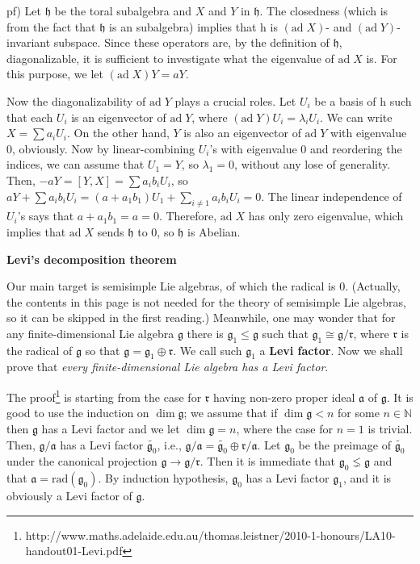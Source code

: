 \documentclass{article}
\newcommand{\NaN}{\mathbb{N}}
\newcommand{\lie}[1]{\mathfrak{#1}}
\newcommand{\ad}[1]{\mathrm{ad}\; #1}
\begin{document}
pf) Let $\lie{h}$ be the toral subalgebra and $X$ and $Y$ in $\lie{h}$.
The closedness (which is from the fact that $\lie{h}$ is an subalgebra) implies that h is $(\ad{X})$- and $(\ad{Y})$-invariant subspace.
Since these operators are, by the definition of $\lie{h}$, diagonalizable, it is sufficient to investigate what the eigenvalue of $\ad{X}$ is.
For this purpose, we let $(\ad{X})Y = aY$.

Now the diagonalizability of $\ad{Y}$ plays a crucial roles.
Let $U_i$ be a basis of h such that each $U_i$ is an eigenvector of $\ad{Y}$, where $(\ad{Y})U_i = \lambda_i U_i$.
We can write $X = \sum a_i U_i$.
On the other hand, $Y$ is also an eigenvector of $\ad{Y}$ with eigenvalue 0, obviously.
Now by linear-combining $U_i$'s with eigenvalue 0 and reordering the indices, we can assume that $U_1 = Y$, so $\lambda_1 = 0$, without any lose of generality.
Then, $-aY = [Y, X] = \sum a_i b_i U_i$, so $aY + \sum a_i b_i U_i = (a+a_1 b_1)U_1 + \sum_{i \ne 1} a_i b_i U_i = 0$.
The linear independence of $U_i$'s says that $a+a_1 b_1 = a = 0$.
Therefore, $\ad{X}$ has only zero eigenvalue, which implies that $\ad{X}$ sends $\lie{h}$ to 0, so $\lie{h}$ is Abelian.

\newpage

\textbf{Levi's decomposition theorem}

Our main target is semisimple Lie algebras, of which the radical is 0.
(Actually, the contents in this page is not needed for the theory of semisimple Lie algebras, so it can be skipped in the first reading.)
Meanwhile, one may wonder that for any finite-dimensional Lie algebra $\lie{g}$ there is $\lie{g}_1 \le \lie{g}$ such that $\lie{g}_1 \cong \lie{g}/\lie{r}$, where $\lie{r}$ is the radical of $\lie{g}$ so that $\lie{g} = \lie{g}_1 \oplus \lie{r}$.
We call such $\lie{g}_1$ a \textbf{Levi factor}.
Now we shall prove that \textit{every finite-dimensional Lie algebra has a Levi factor}.

The proof\footnote{\scriptsize{http://www.maths.adelaide.edu.au/thomas.leistner/2010-1-honours/LA10-handout01-Levi.pdf}} is starting from the case for $\lie{r}$ having non-zero proper ideal $\lie{a}$ of $\lie{g}$.
It is good to use the induction on $\dim{\lie{g}}$; we assume that if $\dim{\lie{g}} < n$ for some $n \in \NaN$ then $\lie{g}$ has a Levi factor and we let $\dim{\lie{g}} = n$, where the case for $n = 1$ is trivial.
Then, $\lie{g}/\lie{a}$ has a Levi factor $\tilde{\lie{g}_0}$, i.e., $\lie{g}/\lie{a} = \tilde{\lie{g}_0} \oplus \lie{r}/\lie{a}$.
Let $\lie{g}_0$ be the preimage of $\tilde{\lie{g}_0}$ under the canonical projection $\lie{g} \to \lie{g}/\lie{r}$.
Then it is immediate that $\lie{g}_0 \lneq \lie{g}$ and that $\lie{a} = \textrm{rad}(\lie{g}_0)$.
By induction hypothesis, $\lie{g}_0$ has a Levi factor $\lie{g}_1$, and it is obviously a Levi factor of $\lie{g}$.
\end{document}
